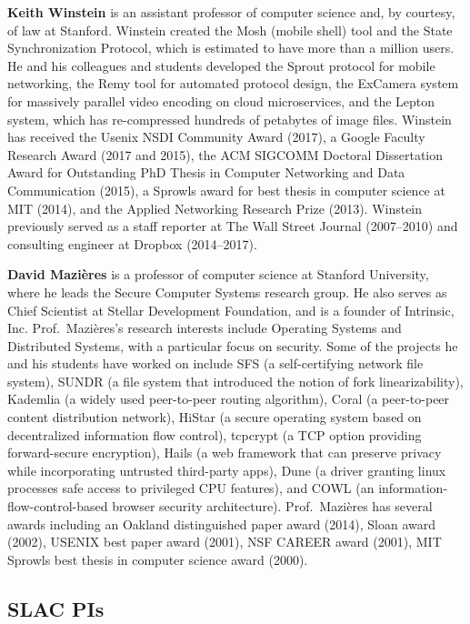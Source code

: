 \documentclass[11pt]{article}
\newcommand{\slim}{\vspace{\baselineskip}}
\begin{document}
\noindent \textbf{Keith Winstein} is an assistant professor of
computer science and, by courtesy, of law at Stanford. Winstein
created the Mosh (mobile shell) tool and the State Synchronization
Protocol, which is estimated to have more than a million users. He and
his colleagues and students developed the Sprout protocol for mobile
networking, the Remy tool for automated protocol design, the ExCamera
system for massively parallel video encoding on cloud microservices,
and the Lepton system, which has re-compressed hundreds of petabytes
of image files. Winstein has received the Usenix NSDI Community Award
(2017), a Google Faculty Research Award (2017 and 2015), the ACM
SIGCOMM Doctoral Dissertation Award for Outstanding PhD Thesis in
Computer Networking and Data Communication (2015), a Sprowls award for
best thesis in computer science at MIT (2014), and the Applied
Networking Research Prize (2013). Winstein previously served as a
staff reporter at The Wall Street Journal (2007--2010) and consulting
engineer at Dropbox (2014--2017).

\slim

\noindent \textbf{David Mazi\`{e}res} is a professor of computer
science at Stanford University, where he leads the Secure Computer
Systems research group. He also serves as Chief Scientist at Stellar
Development Foundation, and is a founder of Intrinsic,
Inc. Prof.~Mazi\`{e}res's research interests include Operating Systems
and Distributed Systems, with a particular focus on security. Some of
the projects he and his students have worked on include SFS (a
self-certifying network file system), SUNDR (a file system that
introduced the notion of fork linearizability), Kademlia (a widely
used peer-to-peer routing algorithm), Coral (a peer-to-peer content
distribution network), HiStar (a secure operating system based on
decentralized information flow control), tcpcrypt (a TCP option
providing forward-secure encryption), Hails (a web framework that can
preserve privacy while incorporating untrusted third-party apps), Dune
(a driver granting linux processes safe access to privileged CPU
features), and COWL (an information-flow-control-based browser
security architecture). Prof.~Mazi\`{e}res has several awards
including an Oakland distinguished paper award (2014), Sloan award
(2002), USENIX best paper award (2001), NSF CAREER award (2001), MIT
Sprowls best thesis in computer science award (2000).

\subsection{SLAC PIs}
\end{document}
